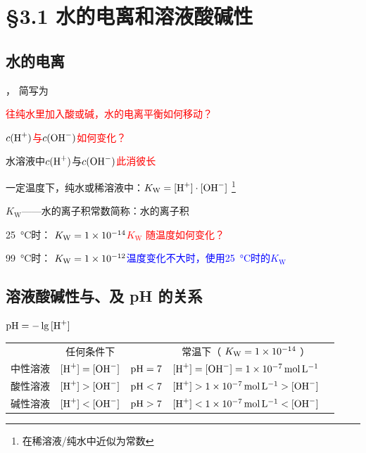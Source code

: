 \section{\S 3.1 水的电离和溶液酸碱性}\label{sect:水的电离和溶液酸碱性}

    \subsection{水的电离}\label{subsec:水的电离}
        
        ，
        简写为 

        \textcolor{red}{往纯水里加入酸或碱，水的电离平衡如何移动？}

        \textcolor{red}{\(c(\cemh{H+})\)与\(c(\cemh{OH^-})\)如何变化？}

        水溶液中\(c(\cemh{H+})\)与\(c(\cemh{OH^-})\)\textcolor{red}{此消彼长}

        一定温度下，纯水或稀溶液中：\(K_\text{W} = \cemh{[H+]} \cdot \cemh{[OH^-]}\)
        \footnote{\cemh{[H2O]} 在稀溶液/纯水中近似为常数}

        \(K_\text{W}\)——水的离子积常数\qquad 简称：水的离子积

        \SI{25}{\degreeCelsius}时： \( K_\text{W} = \SI{1E-14}{}\)\quad\qquad \textcolor{red}{\( K_\text{W} \) 随温度如何变化？}

        \SI{99}{\degreeCelsius}时： \( K_\text{W} = \SI{1E-12}{}\)\quad\qquad \textcolor{blue}{温度变化不大时，使用\SI{25}{\degreeCelsius}时的\( K_\text{W} \)}

    \subsection{溶液酸碱性与\texorpdfstring{\cemh{[H+]}}{H⁺}、\texorpdfstring{\cemh{[OH^-]}}{OH⁻}及 pH 的关系}\label{subsec:溶液酸碱性与[H+]、[OH^-]及pH的关系}

        \( \cemh{pH} = -\lg{}\cemh{[H+]} \) 

        \noindent
        \begin{tabular}{ccccc}
                        & 任何条件下 & & 常温下（ \( K_\text{W} = \SI{1E-14}{}\) ）\\
            中性溶液 & \( \cemh{[H+]} = \cemh{[OH^-]} \) & \( \cemh{pH} = 7 \) & \textcolor{blue}{\( \cemh{[H+]} = \cemh{[OH^-]} = \SI{1E-7}{\mole\per\litre} \) } \\
            酸性溶液 & \( \cemh{[H+]} > \cemh{[OH^-]} \) & \( \cemh{pH} < 7 \) & \textcolor{blue}{\( \cemh{[H+]} > \SI{1E-7}{\mole\per\litre} > \cemh{[OH^-]} \) } \\
            碱性溶液 & \( \cemh{[H+]} < \cemh{[OH^-]} \) & \( \cemh{pH} > 7 \) & \textcolor{blue}{\( \cemh{[H+]} < \SI{1E-7}{\mole\per\litre} < \cemh{[OH^-]} \) }
        \end{tabular}

